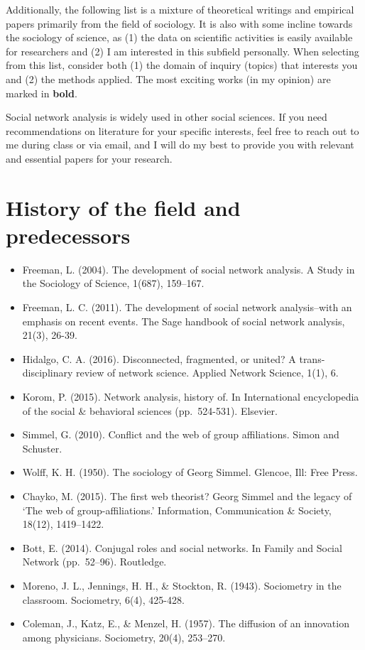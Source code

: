 \documentclass[
]{book}
\begin{document}
Additionally, the following list is a mixture of theoretical writings and empirical papers primarily from the field of sociology. It is also with some incline towards the sociology of science, as (1) the data on scientific activities is easily available for researchers and (2) I am interested in this subfield personally. When selecting from this list, consider both (1) the domain of inquiry (topics) that interests you and (2) the methods applied. The most exciting works (in my opinion) are marked in \textbf{bold}.

Social network analysis is widely used in other social sciences. If you need recommendations on literature for your specific interests, feel free to reach out to me during class or via email, and I will do my best to provide you with relevant and essential papers for your research.

\section*{\texorpdfstring{\textbf{History of the field and predecessors}}{History of the field and predecessors}}\label{history-of-the-field-and-predecessors}

\begin{itemize}
\item
  Freeman, L. (2004). The development of social network analysis. A Study in the Sociology of Science, 1(687), 159--167.
\item
  Freeman, L. C. (2011). The development of social network analysis--with an emphasis on recent events. The Sage handbook of social network analysis, 21(3), 26-39.
\item
  Hidalgo, C. A. (2016). Disconnected, fragmented, or united? A trans-disciplinary review of network science. Applied Network Science, 1(1), 6.
\item
  Korom, P. (2015). Network analysis, history of. In International encyclopedia of the social \& behavioral sciences (pp.~524-531). Elsevier.
\item
  Simmel, G. (2010). Conflict and the web of group affiliations. Simon and Schuster.
\item
  Wolff, K. H. (1950). The sociology of Georg Simmel. Glencoe, Ill: Free Press.
\item
  Chayko, M. (2015). The first web theorist? Georg Simmel and the legacy of `The web of group-affiliations.' Information, Communication \& Society, 18(12), 1419--1422.
\item
  Bott, E. (2014). Conjugal roles and social networks. In Family and Social Network (pp.~52--96). Routledge.
\item
  Moreno, J. L., Jennings, H. H., \& Stockton, R. (1943). Sociometry in the classroom. Sociometry, 6(4), 425-428.
\item
  Coleman, J., Katz, E., \& Menzel, H. (1957). The diffusion of an innovation among physicians. Sociometry, 20(4), 253--270.
\end{itemize}
\end{document}
